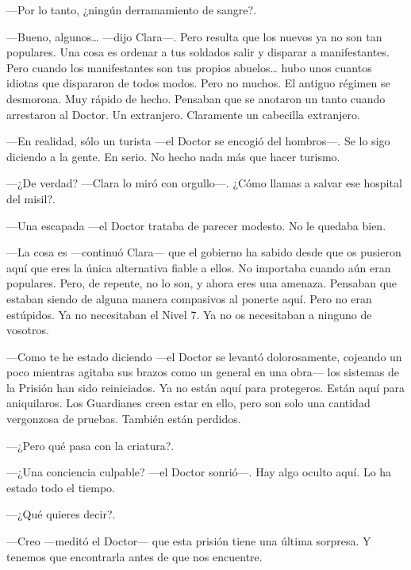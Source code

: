 ---Por lo tanto, ¿ningún derramamiento de sangre?.

---Bueno, algunos\ldots{} ---dijo Clara---. Pero resulta que los nuevos
ya no son tan populares. Una cosa es ordenar a tus soldados salir y
disparar a manifestantes. Pero cuando los manifestantes son tus propios
abuelos\ldots{} hubo unos cuantos idiotas que dispararon de todos modos.
Pero no muchos. El antiguo régimen se desmorona. Muy rápido de hecho.
Pensaban que se anotaron un tanto cuando arrestaron al Doctor. Un
extranjero. Claramente un cabecilla extranjero.

---En realidad, sólo un turista ---el Doctor se encogió del hombros---.
Se lo sigo diciendo a la gente. En serio. No hecho nada más que hacer
turismo.

---¿De verdad? ---Clara lo miró con orgullo---. ¿Cómo llamas a salvar
ese hospital del misil?.

---Una escapada ---el Doctor trataba de parecer modesto. No le quedaba
bien.

---La cosa es ---continuó Clara--- que el gobierno ha sabido desde que
os pusieron aquí que eres la única alternativa fiable a ellos. No
importaba cuando aún eran populares. Pero, de repente, no lo son, y
ahora eres una amenaza. Pensaban que estaban siendo de alguna manera
compasivos al ponerte aquí. Pero no eran estúpidos. Ya no necesitaban el
Nivel 7. Ya no os necesitaban a ninguno de vosotros.

---Como te he estado diciendo ---el Doctor se levantó dolorosamente,
cojeando un poco mientras agitaba sus brazos como un general en una
obra--- los sistemas de la Prisión han sido reiniciados. Ya no están
aquí para protegeros. Están aquí para aniquilaros. Los Guardianes creen
estar en ello, pero son solo una cantidad vergonzosa de pruebas. También
están perdidos.

---¿Pero qué pasa con la criatura?.

---¿Una conciencia culpable? ---el Doctor sonrió---. Hay algo oculto
aquí. Lo ha estado todo el tiempo.

---¿Qué quieres decir?.

---Creo ---meditó el Doctor--- que esta prisión tiene una última
sorpresa. Y tenemos que encontrarla antes de que nos encuentre.
